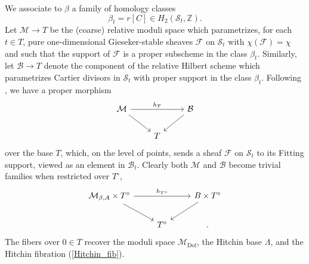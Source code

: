 \documentclass[11pt]{amsart}
\theoremstyle{plain}
\theoremstyle{definition}
\theoremstyle{remark}
\newcommand{\BZ}{{\mathbb{Z}}}
\newcommand{\CB}{{\mathcal B}}
\newcommand{\CF}{{\mathcal F}}
\newcommand{\CM}{{\mathcal M}}
\newcommand{\CS}{{\mathcal S}}
\begin{document}
We associate to $\beta$ a family of homology classes 
\begin{equation}\label{beta_t}
\beta_t = r[C] \in H_2(\CS_t, \BZ).
\end{equation}
Let $\CM \rightarrow T$ be the (coarse) relative moduli space which parametrizes, for each $t \in T$, pure one-dimensional Gieseker-stable sheaves $\CF$ on $\CS_t$ with $\chi(\CF) =\chi$ and such that the support of $\CF$ is a proper subscheme in the class $\beta_t$. Similarly, let $\CB \rightarrow T$ denote the component of the relative Hilbert scheme which parametrizes Cartier divisors in $\CS_t$ with proper support in the class $\beta_t$.  Following \cite[Section 5.3]{GIT}, we have a proper morphism 
\begin{equation*}
\begin{tikzcd}
\CM \ar [rr,"h_T"]\ar[rd]& & \CB\ar[ld]\\
 &T&
\end{tikzcd}
\end{equation*}  
over the base $T$, which, on the level of points, sends a sheaf $\CF$ on $\CS_t$ to its Fitting support, viewed as an element in $\CB_t$.
Clearly both $\CM$ and $\CB$ become trivial families when restricted over $T^\circ$,
\begin{equation*}
\begin{tikzcd}
\CM_{\beta,A} \times T^\circ \ar [rr,"h_{T^\circ}"]\ar[rd]& & B \times T^\circ \ar[ld]\\
 &T^\circ&.
\end{tikzcd}
\end{equation*}  
The fibers over $0 \in T$ recover the moduli space $\CM_{\mathrm{Dol}}$, the Hitchin base $\Lambda$, and the Hitchin fibration (\ref{Hitchin_fib}).
\end{document}
